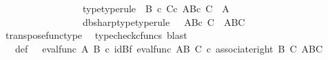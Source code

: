 \begin{isabellebody}
\ \ \ \ \ \ \ \ \ \ \ \ \ \ \ \ \ {\isasymphi}{\isacharunderscore}{\kern0pt}type{\isacharbrackleft}{\kern0pt}type{\isacharunderscore}{\kern0pt}rule{\isacharbrackright}{\kern0pt}{\isacharcolon}{\kern0pt}\ {\isachardoublequoteopen}{\isasymphi}{\isacharcolon}{\kern0pt}\ B\ {\isasymtimes}\isactrlsub c\ {\isacharparenleft}{\kern0pt}C{\isasymtimes}\isactrlsub c\ {\isacharparenleft}{\kern0pt}A\isactrlbsup {\isacharparenleft}{\kern0pt}B{\isasymtimes}\isactrlsub c\ C{\isacharparenright}{\kern0pt}\isactrlesup {\isacharparenright}{\kern0pt}{\isacharparenright}{\kern0pt}\ {\isasymrightarrow}\ A{\isachardoublequoteclose}\ \ \isanewline
\ \ \ \ \ \ \ \ \ \ \ \ \ \ \ \ \ {\isasymphi}dbsharp{\isacharunderscore}{\kern0pt}type{\isacharbrackleft}{\kern0pt}type{\isacharunderscore}{\kern0pt}rule{\isacharbrackright}{\kern0pt}{\isacharcolon}{\kern0pt}\ {\isachardoublequoteopen}{\isacharparenleft}{\kern0pt}{\isasymphi}\isactrlsup {\isasymsharp}{\isacharparenright}{\kern0pt}\isactrlsup {\isasymsharp}\ {\isacharcolon}{\kern0pt}\ {\isacharparenleft}{\kern0pt}A\isactrlbsup {\isacharparenleft}{\kern0pt}B{\isasymtimes}\isactrlsub c\ C{\isacharparenright}{\kern0pt}\isactrlesup {\isacharparenright}{\kern0pt}\ {\isasymrightarrow}\ {\isacharparenleft}{\kern0pt}{\isacharparenleft}{\kern0pt}A\isactrlbsup B\isactrlesup {\isacharparenright}{\kern0pt}\isactrlbsup C\isactrlesup {\isacharparenright}{\kern0pt}{\isachardoublequoteclose}\isanewline
\ \ \ \ \isamarkupfalse%
\ transpose{\isacharunderscore}{\kern0pt}func{\isacharunderscore}{\kern0pt}type\ \isamarkupfalse%
\ {\isacharparenleft}{\kern0pt}typecheck{\isacharunderscore}{\kern0pt}cfuncs{\isacharcomma}{\kern0pt}\ blast{\isacharparenright}{\kern0pt}\isanewline
\isanewline
\ \ \isamarkupfalse%
\ {\isasympsi}\ \ {\isasympsi}{\isacharunderscore}{\kern0pt}def{\isacharcolon}{\kern0pt}\ {\isachardoublequoteopen}{\isasympsi}\ {\isacharequal}{\kern0pt}\ {\isacharparenleft}{\kern0pt}eval{\isacharunderscore}{\kern0pt}func\ A\ B{\isacharparenright}{\kern0pt}\ {\isasymcirc}\isactrlsub c\ {\isacharparenleft}{\kern0pt}id{\isacharparenleft}{\kern0pt}B{\isacharparenright}{\kern0pt}{\isasymtimes}\isactrlsub f\ eval{\isacharunderscore}{\kern0pt}func\ {\isacharparenleft}{\kern0pt}A\isactrlbsup B\isactrlesup {\isacharparenright}{\kern0pt}\ C{\isacharparenright}{\kern0pt}\ {\isasymcirc}\isactrlsub c\ {\isacharparenleft}{\kern0pt}associate{\isacharunderscore}{\kern0pt}right\ B\ C\ {\isacharparenleft}{\kern0pt}{\isacharparenleft}{\kern0pt}A\isactrlbsup B\isactrlesup {\isacharparenright}{\kern0pt}\isactrlbsup C\isactrlesup {\isacharparenright}{\kern0pt}{\isacharparenright}{\kern0pt}{\isachardoublequoteclose}\ \isanewline

\end{isabellebody}
